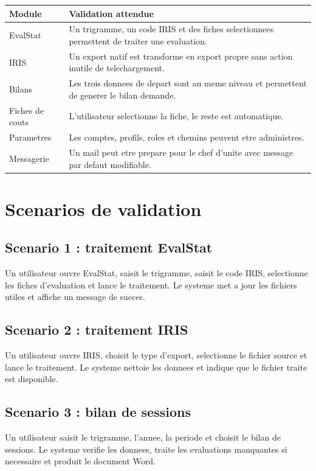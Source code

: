 \documentclass[11pt,a4paper]{report}
\begin{document}
\begin{longtable}{L{4cm} L{10cm}}
\toprule
{}
\textbf{Module} & \textbf{Validation attendue} \\
\midrule
EvalStat & Un trigramme, un code IRIS et des fiches selectionnees permettent de traiter une evaluation. \\
IRIS & Un export natif est transforme en export propre sans action inutile de telechargement. \\
Bilans & Les trois donnees de depart sont au meme niveau et permettent de generer le bilan demande. \\
Fiches de couts & L'utilisateur selectionne la fiche, le reste est automatique. \\
Parametres & Les comptes, profils, roles et chemins peuvent etre administres. \\
Messagerie & Un mail peut etre prepare pour le chef d'unite avec message par defaut modifiable. \\
\bottomrule
\end{longtable}

\chapter{Scenarios de validation}

\section{Scenario 1 : traitement EvalStat}

Un utilisateur ouvre EvalStat, saisit le trigramme, saisit le code IRIS, selectionne les fiches d'evaluation et lance le traitement. Le systeme met a jour les fichiers utiles et affiche un message de succes.

\section{Scenario 2 : traitement IRIS}

Un utilisateur ouvre IRIS, choisit le type d'export, selectionne le fichier source et lance le traitement. Le systeme nettoie les donnees et indique que le fichier traite est disponible.

\section{Scenario 3 : bilan de sessions}

Un utilisateur saisit le trigramme, l'annee, la periode et choisit le bilan de sessions. Le systeme verifie les donnees, traite les evaluations manquantes si necessaire et produit le document Word.
\end{document}
